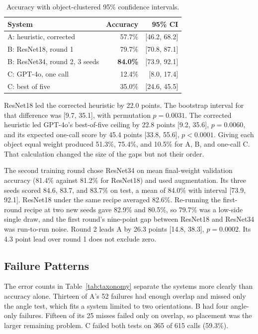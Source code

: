 \documentclass[10pt,conference,compsoc]{IEEEtran}
\begin{document}
\begin{table}[t]
\caption{Accuracy with object-clustered 95\% confidence intervals.}
\label{tab:accuracy}
\centering
\begin{tabular}{lrr}
\toprule
System & Accuracy & 95\% CI \\
\midrule
A: heuristic, corrected & 57.7\% & [46.2, 68.2] \\
B: ResNet18, round 1 & 79.7\% & [70.8, 87.1] \\
B: ResNet34, round 2, 3 seeds & \textbf{84.0\%} & [73.9, 92.1] \\
C: GPT-4o, one call & 12.4\% & [8.0, 17.4] \\
C: best of five & 35.0\% & [24.6, 45.5] \\
\bottomrule
\end{tabular}
\end{table}

ResNet18 led the corrected heuristic by 22.0 points. The bootstrap interval
for that difference was [9.7, 35.1], with permutation $p=0.0031$. The
corrected heuristic led GPT-4o's best-of-five ceiling by 22.8 points [9.2,
35.6], $p=0.0060$, and its expected one-call score by 45.4 points [33.8,
55.6], $p<0.0001$. Giving each object equal weight produced 51.3\%, 75.4\%,
and 10.5\% for A, B, and one-call C. That calculation changed the size of the
gaps but not their order.

The second training round chose ResNet34 on mean final-weight validation
accuracy (81.4\% against 81.2\% for ResNet18) and used augmentation. Its
three seeds scored 84.6, 83.7, and 83.7\% on test, a mean of 84.0\% with
interval [73.9, 92.1]. ResNet18 under the same recipe averaged 82.6\%.
Re-running the first-round recipe at two new seeds gave 82.9\% and 80.5\%,
so 79.7\% was a low-side single draw, and the first round's nine-point gap
between ResNet18 and ResNet34 was run-to-run noise. Round 2 leads A by 26.3
points [14.8, 38.3], $p=0.0002$. Its 4.3 point lead over round 1 does not
exclude zero.

\subsection{Failure Patterns}

The error counts in Table~\ref{tab:taxonomy} separate the systems more clearly
than accuracy alone. Thirteen of A's 52 failures had enough overlap and missed
only the angle test, which fits a system limited to two orientations. B had
four angle-only failures. Fifteen of its 25 misses failed only on overlap, so
placement was the larger remaining problem. C failed both tests on 365 of 615
calls (59.3\%).
\end{document}
